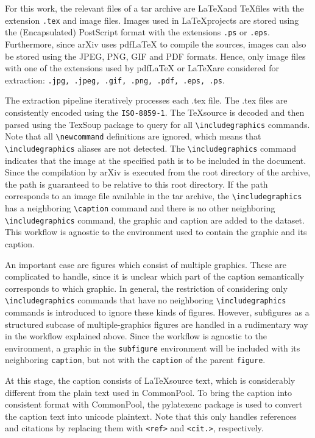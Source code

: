 For this work, the relevant files of a tar archive are \LaTeX and \TeX files with the extension \texttt{.tex} and image files. Images used in \LaTeX projects are stored using the (Encapsulated) PostScript format with the extensions \texttt{.ps} or \texttt{.eps}. Furthermore, since arXiv uses pdfLaTeX to compile the sources, images can also be stored using the JPEG, PNG, GIF and PDF formats. Hence, only image files with one of the extensions used by pdfLaTeX or \LaTeX are considered for extraction: \texttt{.jpg, .jpeg, .gif, .png, .pdf, .eps, .ps}.

The extraction pipeline iteratively processes each .tex file. The .tex files are consistently encoded using the \texttt{ISO-8859-1}. The \TeX source is decoded and then parsed using the TexSoup package \cite{TexSoup} to query for all \verb|\includegraphics| commands. Note that all \verb|\newcommand| definitions are ignored, which means that \verb|\includegraphics| aliases are not detected. The \verb|\includegraphics| command indicates that the image at the specified path is to be included in the document. Since the compilation by arXiv is executed from the root directory of the archive, the path is guaranteed to be relative to this root directory. If the path corresponds to an image file available in the tar archive, the \verb|\includegraphics| has a neighboring \verb|\caption| command and there is no other neighboring \verb|\includegraphics| command, the graphic and caption are added to the dataset. This workflow is agnostic to the environment used to contain the graphic and its caption.

An important case are figures which consist of multiple graphics. These are complicated to handle, since it is unclear which part of the caption semantically corresponds to which graphic. In general, the restriction of considering only \verb|\includegraphics| commands that have no neighboring \verb|\includegraphics| commands is introduced to ignore these kinds of figures. However, subfigures as a structured subcase of multiple-graphics figures are handled in a rudimentary way in the workflow explained above. Since the workflow is agnostic to the environment, a graphic in the \texttt{subfigure} environment will be included with its neighboring \texttt{caption}, but not with the \texttt{caption} of the parent \texttt{figure}.

At this stage, the caption consists of \LaTeX source text, which is considerably different from the plain text used in CommonPool. To bring the caption into consistent format with CommonPool, the pylatexenc package \cite{pylatexenc} is used to convert the caption text into unicode plaintext. Note that this only handles references and citations by replacing them with \verb|<ref>| and \verb|<cit.>|, respectively.


